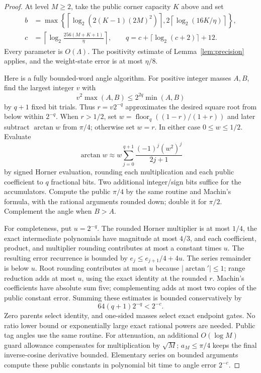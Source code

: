 \documentclass[11pt]{article}
\theoremstyle{definition}
\DeclareMathOperator{\atan}{arctan}
\begin{document}
\begin{proof}
At level $M\ge2$, take the public corner capacity $K$ above and set
\begin{align*}
 b&=\max\left\{\left\lceil\log_2(2(K-1)(2M)^2)\right\rceil,
           2\left\lceil\log_2(16K/\eta)\right\rceil\right\},\\
 c&=\left\lceil\log_2\frac{256(M+K+1)}\eta\right\rceil,\qquad
 q=c+\lceil\log_2(c+2)\rceil+12.
\end{align*}
Every parameter is $O(\Lambda)$. The positivity estimate of
Lemma~\ref{lem:precision} applies, and the weight-state error is at most
$\eta/8$.

Here is a fully bounded-word angle algorithm. For positive integer masses
$A,B$, find the largest integer $v$ with
\[
 v^2\max(A,B)\le 2^{2q}\min(A,B)
\]
by $q+1$ fixed bit trials. Thus $r=v2^{-q}$ approximates the desired
square root from below within $2^{-q}$. When $r>1/2$, set
$w=\operatorname{floor}_q((1-r)/(1+r))$ and later subtract
$\atan w$ from $\pi/4$; otherwise set $w=r$. In either case
$0\le w\le1/2$. Evaluate
\[
 \atan w\approx w\sum_{j=0}^{q+1}\frac{(-1)^j(w^2)^j}{2j+1}
\]
by signed Horner evaluation, rounding each multiplication and each public
coefficient to $q$ fractional bits. Two additional integer/sign bits
suffice for the accumulators. Compute the public $\pi/4$ by the same
routine and Machin's formula, with the rational arguments rounded down;
double it for $\pi/2$. Complement the angle when $B>A$.

For completeness, put $u=2^{-q}$. The rounded Horner multiplier is at
most $1/4$, the exact intermediate polynomials have magnitude at most
$4/3$, and each coefficient, product, and multiplier rounding contributes
at most a constant times $u$. The resulting error recurrence is bounded
by $e_j\le e_{j+1}/4+4u$. The series remainder is below $u$.
Root rounding contributes at most $u$ because $|\atan'|\le1$; range
reduction adds at most $u$, using the exact identity at the rounded $r$.
Machin's coefficients have absolute sum five; complementing adds at most
two copies of the public constant error. Summing these estimates is
bounded conservatively by
\[
 64(q+1)2^{-q}<2^{-c}.
\]
Zero parents select identity, and one-sided masses select exact endpoint
gates. No ratio lower bound or exponentially large exact rational powers
are needed. Public tag angles use the same routine. For attenuation,
an additional $O(\log M)$ guard allowance compensates for multiplication
by $\sqrt M$; $a_M\le\pi/4$ keeps the final inverse-cosine derivative
bounded. Elementary series on bounded arguments compute these public
constants in polynomial bit time to angle error $2^{-c}$.


\end{proof}
\end{document}
